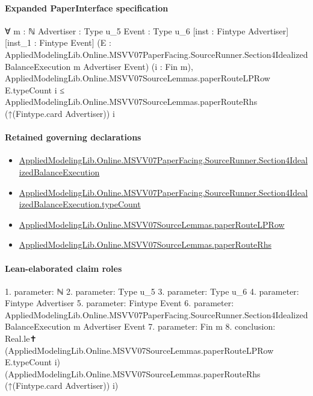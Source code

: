 \documentclass[10pt]{article}
\begin{document}
\paragraph{Expanded PaperInterface specification}
\begin{ReviewVerbatim}
∀ {m : ℕ} {Advertiser : Type u_5} {Event : Type u_6} [inst : Fintype Advertiser] [inst_1 : Fintype Event]
  (E : AppliedModelingLib.Online.MSVV07PaperFacing.SourceRunner.Section4IdealizedBalanceExecution m Advertiser Event)
  (i : Fin m),
  AppliedModelingLib.Online.MSVV07SourceLemmas.paperRouteLPRow E.typeCount i ≤
    AppliedModelingLib.Online.MSVV07SourceLemmas.paperRouteRhs (↑(Fintype.card Advertiser)) i
\end{ReviewVerbatim}

\paragraph{Retained governing declarations}
\begin{itemize}\raggedright
\item \hyperlink{governing-declaration-839fd55f5e095756}{Applied\allowbreak{}Modeling\allowbreak{}Lib.\allowbreak{}Online.\allowbreak{}MSVV07\allowbreak{}Paper\allowbreak{}Facing.\allowbreak{}Source\allowbreak{}Runner.\allowbreak{}Section4\allowbreak{}Idealized\allowbreak{}Balance\allowbreak{}Execution}
\item \hyperlink{governing-declaration-251e5be7cd7b9364}{Applied\allowbreak{}Modeling\allowbreak{}Lib.\allowbreak{}Online.\allowbreak{}MSVV07\allowbreak{}Paper\allowbreak{}Facing.\allowbreak{}Source\allowbreak{}Runner.\allowbreak{}Section4\allowbreak{}Idealized\allowbreak{}Balance\allowbreak{}Execution.\allowbreak{}type\allowbreak{}Count}
\item \hyperlink{governing-declaration-5265a7402e3e118f}{Applied\allowbreak{}Modeling\allowbreak{}Lib.\allowbreak{}Online.\allowbreak{}MSVV07\allowbreak{}Source\allowbreak{}Lemmas.\allowbreak{}paper\allowbreak{}Route\allowbreak{}LP\allowbreak{}Row}
\item \hyperlink{governing-declaration-94329c08d124f812}{Applied\allowbreak{}Modeling\allowbreak{}Lib.\allowbreak{}Online.\allowbreak{}MSVV07\allowbreak{}Source\allowbreak{}Lemmas.\allowbreak{}paper\allowbreak{}Route\allowbreak{}Rhs}
\end{itemize}
\paragraph{Lean-elaborated claim roles}\begin{ReviewVerbatim}
1. parameter: ℕ
2. parameter: Type u_5
3. parameter: Type u_6
4. parameter: Fintype Advertiser
5. parameter: Fintype Event
6. parameter: AppliedModelingLib.Online.MSVV07PaperFacing.SourceRunner.Section4IdealizedBalanceExecution m Advertiser Event
7. parameter: Fin m
8. conclusion: Real.le✝ (AppliedModelingLib.Online.MSVV07SourceLemmas.paperRouteLPRow E.typeCount i)
  (AppliedModelingLib.Online.MSVV07SourceLemmas.paperRouteRhs (↑(Fintype.card Advertiser)) i)
\end{ReviewVerbatim}
\end{document}
